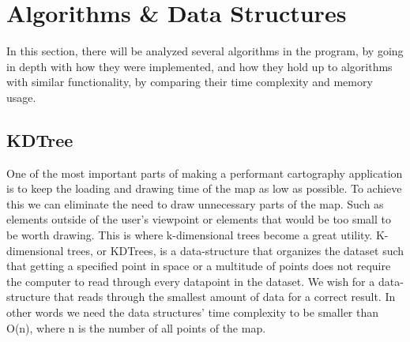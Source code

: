 \section{Algorithms \& Data Structures}

In this section, there will be analyzed several algorithms in the program, by going in depth with how they were implemented, and how they hold up to algorithms with similar functionality, by comparing their time complexity and memory usage.

\subsection{KDTree} \label{KDTree}
One of the most important parts of making a performant cartography application is to keep the loading and drawing time of the map as low as possible. To achieve this we can eliminate the need to draw unnecessary parts of the map. Such as elements outside of the user's viewpoint or elements that would be too small to be worth drawing. This is where k-dimensional trees become a great utility. K-dimensional trees, or KDTrees, is a data-structure that organizes the dataset such that getting a specified point in space or a multitude of points does not require the computer to read through every datapoint in the dataset.\cite{KDTree} We wish for a data-structure that reads through the smallest amount of data for a correct result. In other words we need the data structures' time complexity to be smaller than O(n), where n is the number of all points of the map.\newline


